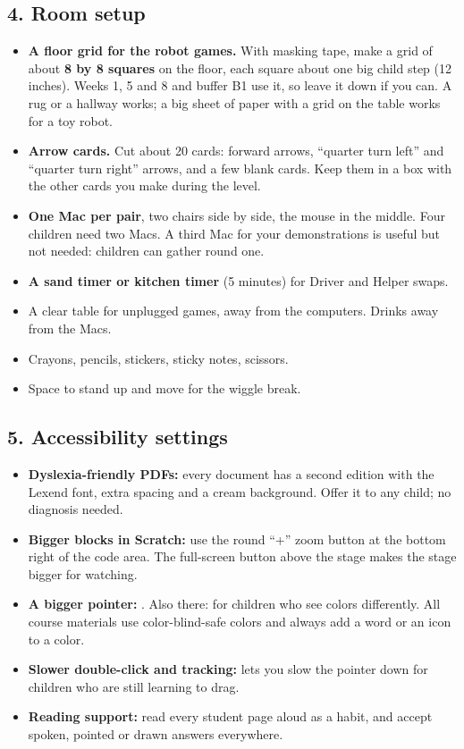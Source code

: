 \documentclass[track=junior,level=1,teacher]{kidscode}
\begin{document}
\subsection{4. Room setup}
\begin{itemize}[itemsep=2pt]
  \item \textbf{A floor grid for the robot games.} With masking tape, make a grid of about
        \textbf{8 by 8 squares} on the floor, each square about one big child step (12 inches).
        Weeks 1, 5 and 8 and buffer B1 use it, so leave it down if you can. A rug or a hallway works;
        a big sheet of paper with a grid on the table works for a toy robot.
  \item \textbf{Arrow cards.} Cut about 20 cards: forward arrows, \enquote{quarter turn left} and
        \enquote{quarter turn right} arrows, and a few blank cards. Keep them in a box with the other
        cards you make during the level.
  \item \textbf{One Mac per pair}, two chairs side by side, the mouse in the middle. Four children
        need two Macs. A third Mac for your demonstrations is useful but not needed: children can
        gather round one.
  \item \textbf{A sand timer or kitchen timer} (5 minutes) for Driver and Helper swaps.
  \item A clear table for unplugged games, away from the computers. Drinks away from the Macs.
  \item Crayons, pencils, stickers, sticky notes, scissors.
  \item Space to stand up and move for the wiggle break.
\end{itemize}

\subsection{5. Accessibility settings}
\begin{itemize}[itemsep=3pt]
  \item \textbf{Dyslexia-friendly PDFs:} every document has a second edition with the Lexend font,
        extra spacing and a cream background. Offer it to any child; no diagnosis needed.
  \item \textbf{Bigger blocks in Scratch:} use the round \enquote{+} zoom button at the bottom right of
        the code area. The full-screen button above the stage makes the stage bigger for watching.
  \item \textbf{A bigger pointer:} .
        Also there:  for children who see colors differently. All course materials
        use color-blind-safe colors and always add a word or an icon to a color.
  \item \textbf{Slower double-click and tracking:}  lets you slow the
        pointer down for children who are still learning to drag.
  \item \textbf{Reading support:} read every student page aloud as a habit, and accept spoken,
        pointed or drawn answers everywhere.
\end{itemize}
\end{document}
